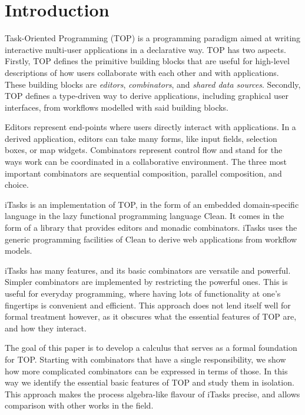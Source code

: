 
\section{Introduction}

Task-Oriented Programming (TOP) is a programming paradigm aimed at writing interactive multi-user applications in a declarative way.
TOP has two aspects.
Firstly, TOP defines the primitive building blocks that are useful for high-level descriptions of how users collaborate with each other and with applications.
These building blocks are \emph{editors}, \emph{combinators}, and \emph{shared data sources}.
Secondly, TOP defines a type-driven way to derive applications, including graphical user interfaces, from workflows modelled with said building blocks.

Editors represent end-points where users directly interact with applications.
In a derived application, editors can take many forms, like input fields, selection boxes, or map widgets.
Combinators represent control flow and stand for the ways work can be coordinated in a collaborative environment.
The three most important combinators are sequential composition, parallel composition, and choice.

iTasks is an implementation of TOP, in the form of an embedded domain-specific language in the lazy functional programming language Clean.
It comes in the form of a library that provides editors and monadic combinators.
iTasks uses the generic programming facilities of Clean to derive web applications from workflow models.

iTasks has many features, and its basic combinators are versatile and powerful.
Simpler combinators are implemented by restricting the powerful ones.
This is useful for everyday programming, where having lots of functionality at one's fingertips is convenient and efficient.
This approach does not lend itself well for formal treatment however, as it obscures what the essential features of TOP are, and how they interact.

The goal of this paper is to develop a calculus that serves as a formal foundation for TOP.
Starting with combinators that have a single responsibility, we show how more complicated combinators can be expressed in terms of those.
In this way we identify the essential basic features of TOP and study them in isolation.
This approach makes the process algebra-like flavour of iTasks precise, and allows comparison with other works in the field.
